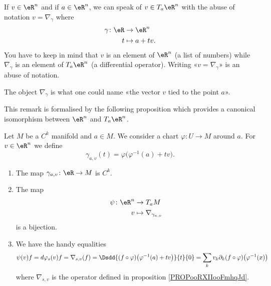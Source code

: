 \begin{normaltext}      \label{NORMooXAJGooDNyxjv}
	If \( v\in \eR^n\) and if \( a\in \eR^n\), we can speak of \( v\in T_a\eR^n\) with the abuse of notation \( v=\nabla_{\gamma}\) where
	\begin{equation}
		\begin{aligned}
			\gamma\colon \eR & \to \eR^n     \\
			t                & \mapsto a+tv.
		\end{aligned}
	\end{equation}
	You have to keep in mind that \( v\) is an element of \( \eR^n\) (a list of numbers) while \( \nabla_{\gamma}\) is an element of \( T_a\eR^n\) (a differential operator). Writing «\( v=\nabla_{\gamma}\)» is an abuse of notation.

	The object \( \nabla_{\gamma}\) is what one could name «the vector \( v\) tied to the point \( a\)».
\end{normaltext}

This remark is formalised by the following proposition which provides a canonical isomorphism between \( \eR^n\) and \( T_a\eR^n\).

\begin{proposition}     \label{PROPooRXIIooFmhqJd}
	Let \( M\) be a \( C^k\) manifold and \( a\in M\). We consider a chart \( \varphi\colon U\to M\) around \( a\). For \( v\in \eR^n\) we define
	\begin{equation}
		\gamma_{a,v}(t)=\varphi\big( \varphi^{-1}(a)+tv \big).
	\end{equation}
	\begin{enumerate}
		\item
		      The map \( \gamma_{a,v}\colon \eR\to M\) is \( C^k\).
		\item
		      The map
		      \begin{equation}
			      \begin{aligned}
				      \psi\colon \eR^n & \to T_aM                      \\
				      v                & \mapsto \nabla_{\gamma_{a,v}}
			      \end{aligned}
		      \end{equation}
		      is a bijection.
		\item
		      We have the handy equalities
		      \begin{equation}
			      \psi(v)f=d\varphi_s(v)f=\nabla_{s,v}(f)=\Dsdd{ (f\circ\varphi)\big( \varphi^{-1}(a)+tv \big) }{t}{0}=\sum_kv_k\partial_k(f\circ\varphi)\big( \varphi^{-1}(x) \big)
		      \end{equation}
		      where \( \nabla_{s,v}\) is the operator defined in proposition \ref{PROPooRXIIooFmhqJd}.
	\end{enumerate}
\end{proposition}

